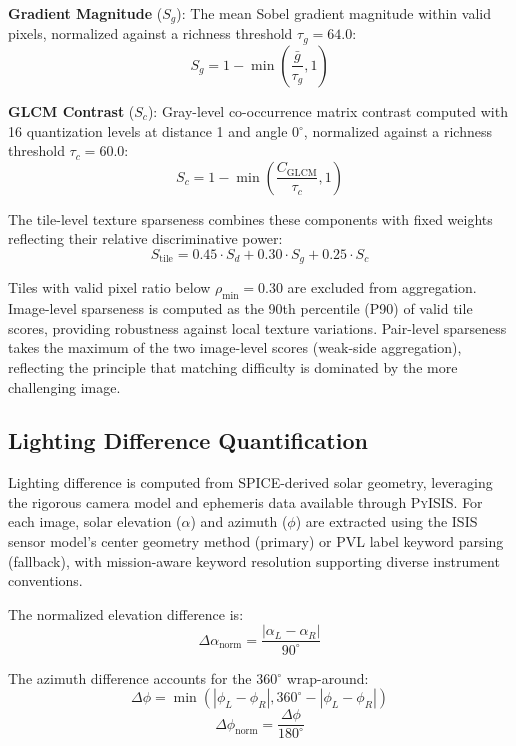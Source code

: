 \documentclass[lettersize,journal]{IEEEtran}
\newcommand{\pyisis}{\textsc{PyISIS}}
\begin{document}
\textbf{Gradient Magnitude} ($S_g$): The mean Sobel gradient magnitude within valid pixels, normalized against a richness threshold $\tau_g = 64.0$:
\begin{equation}
S_g = 1 - \min\left(\frac{\bar{g}}{\tau_g}, 1\right)
\end{equation}

\textbf{GLCM Contrast} ($S_c$): Gray-level co-occurrence matrix contrast computed with 16 quantization levels at distance 1 and angle 0$^\circ$, normalized against a richness threshold $\tau_c = 60.0$:
\begin{equation}
S_c = 1 - \min\left(\frac{C_{\text{GLCM}}}{\tau_c}, 1\right)
\end{equation}

The tile-level texture sparseness combines these components with fixed weights reflecting their relative discriminative power:
\begin{equation}
S_{\text{tile}} = 0.45 \cdot S_d + 0.30 \cdot S_g + 0.25 \cdot S_c
\end{equation}

Tiles with valid pixel ratio below $\rho_{\min} = 0.30$ are excluded from aggregation. Image-level sparseness is computed as the 90th percentile (P90) of valid tile scores, providing robustness against local texture variations. Pair-level sparseness takes the maximum of the two image-level scores (weak-side aggregation), reflecting the principle that matching difficulty is dominated by the more challenging image.

\subsection{Lighting Difference Quantification}

Lighting difference is computed from SPICE-derived solar geometry, leveraging the rigorous camera model and ephemeris data available through \pyisis{}. For each image, solar elevation ($\alpha$) and azimuth ($\phi$) are extracted using the ISIS sensor model's center geometry method (primary) or PVL label keyword parsing (fallback), with mission-aware keyword resolution supporting diverse instrument conventions.

The normalized elevation difference is:
\begin{equation}
\Delta\alpha_{\text{norm}} = \frac{|\alpha_L - \alpha_R|}{90^\circ}
\end{equation}

The azimuth difference accounts for the 360$^\circ$ wrap-around:
\begin{equation}
\Delta\phi = \min(|\phi_L - \phi_R|, 360^\circ - |\phi_L - \phi_R|)
\end{equation}
\begin{equation}
\Delta\phi_{\text{norm}} = \frac{\Delta\phi}{180^\circ}
\end{equation}
\end{document}
